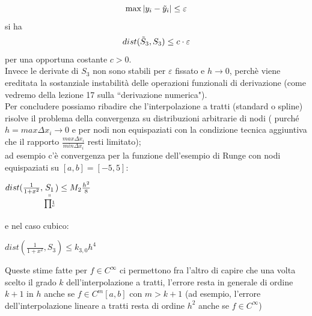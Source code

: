 \documentclass[12pt,a4paper]{article}
\newcommand{\inter}{\begin{matrix}\prod\end{matrix}}
\begin{document}
\[\max |y_i - \Tilde{y}_i| \le \varepsilon\]
si ha \[dist(\Tilde{S}_3, S_3) \le c \cdot \varepsilon\]
per una opportuna costante $c>0$.\\
Invece le derivate di $S_3$ non sono stabili per $\varepsilon$ fissato e $h \to 0$, perchè viene ereditata la sostanziale instabilità delle operazioni funzionali di derivazione (come vedremo della lezione 17 sulla ``derivazione numerica").\\
Per concludere possiamo ribadire che l'interpolazione a tratti (standard o spline) risolve il problema della convergenza su distribuzioni arbitrarie di nodi ( purché $h=max\Delta x_i \rightarrow 0$ e per nodi non equispaziati con la condizione tecnica aggiuntiva che il rapporto $\frac{max\Delta x_i}{min\Delta x_i}$ resti limitato);\\
ad esempio c'è convergenza per la funzione dell'esempio di Runge con nodi equispaziati su $[a,b]=[-5,5]$:\\
\begin{center}
    $dist(\frac{1}{1+x^2}, \underset{\underset{\inter^1_c}{\shortparallel}}{S_1}) \leq M_2 \frac{h^2}{8}$
\end{center}
e nel caso cubico: 
\begin{center}
$dist(\frac{1}{1+x^2},S_3)\leq k_{3,0} h^4$\\
\end{center}
Queste stime fatte per $f \in C^\infty$ ci permettono fra l'altro di capire che una volta scelto il grado $k$ dell'interpolazione a tratti, l'errore resta in generale di ordine $k+1$ in $h$ anche se $f \in C^m [a,b]$ con $m > k+1$ (ad esempio, l'errore dell'interpolazione lineare a tratti resta di ordine $h^2$ anche se $f \in C^\infty$)
\end{document}
